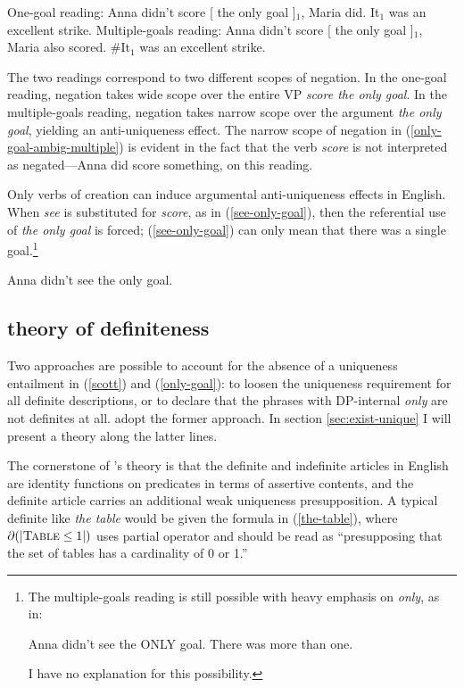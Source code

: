 \begin{exe}
	\ex \label{only-goal-ambig-one} One-goal reading: Anna didn't score [ the only goal ]$_1$, Maria did. It$_1$ was an excellent strike.
	\ex \label{only-goal-ambig-multiple} Multiple-goals reading: Anna didn't score [ the only goal ]$_1$, Maria also scored. \#It$_1$ was an excellent strike.
\end{exe}

The two readings correspond to two different scopes of negation. In the one-goal reading, negation takes wide scope over the entire VP \textit{score the only goal}. In the multiple-goals reading, negation takes narrow scope over the argument \textit{the only goal}, yielding an anti-uniqueness effect. The narrow scope of negation in (\ref{only-goal-ambig-multiple}) is evident in the fact that the verb \textit{score} is not interpreted as negated---Anna did score something, on this reading.

Only verbs of creation can induce argumental anti-uniqueness effects in English. When \textit{see} is substituted for \textit{score}, as in (\ref{see-only-goal}), then the referential use of \textit{the only goal} is forced; (\ref{see-only-goal}) can only mean that there was a single goal.\footnote{The multiple-goals reading is still possible with heavy emphasis on \textit{only}, as in: \begin{exe} \ex Anna didn't see the ONLY goal. There was more than one. \end{exe} I have no explanation for this possibility.}

\begin{exe}
	\ex \label{see-only-goal} Anna didn't see the only goal.
\end{exe}

\subsection{ theory of definiteness}
Two approaches are possible to account for the absence of a uniqueness entailment in (\ref{scott}) and (\ref{only-goal}): to loosen the uniqueness requirement for all definite descriptions, or to declare that the phrases with DP-internal \textit{only} are not definites at all. \citeauthor{cb2015} adopt the former approach. In section \ref{sec:exist-unique} I will present a theory along the latter lines.

The cornerstone of \citeauthor{cb2015}'s theory is that the definite and indefinite articles in English are identity functions on predicates in terms of assertive contents, and the definite article carries an additional weak uniqueness presupposition. A typical definite like \textit{the table} would be given the formula in (\ref{the-table}), where $\partial(|\textsc{Table} \le 1|)$ uses  partial operator and should be read as ``presupposing that the set of tables has a cardinality of 0 or 1.''

